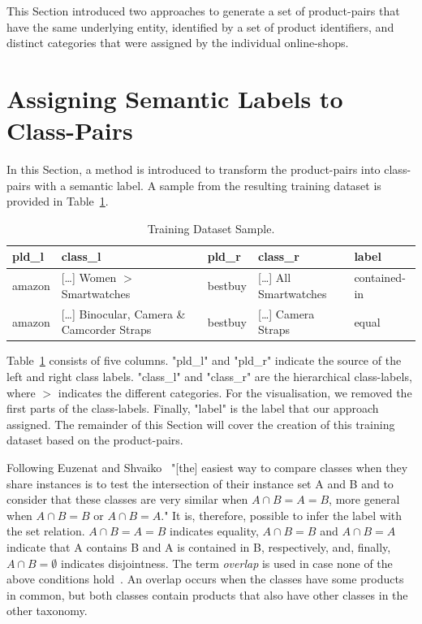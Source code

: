 This Section introduced two approaches to generate a set of product-pairs that have the same underlying
entity, identified by a set of product identifiers, and distinct categories that were assigned by the individual
online-shops.

\section{Assigning Semantic Labels to Class-Pairs}

In this Section, a method is introduced to transform the product-pairs into class-pairs with a semantic label.
A sample from the resulting training dataset is provided in Table~\ref{tab:goldstandard-example}.
\begin{table}[htbp]
    \begin{tabularx}{\textwidth}{lXlX|l}
        pld\_l & class\_l & pld\_r & class\_r & label \\
        \hline
        amazon & [\ldots] Women $>$ Smartwatches & bestbuy & [\ldots] All Smartwatches & contained-in \\
        amazon & [\ldots] Binocular, Camera \& Camcorder Straps & bestbuy & [\ldots] Camera Straps & equal \\
    \end{tabularx}
    \caption{Training Dataset Sample.}
    \label{tab:goldstandard-example}
\end{table}
Table~\ref{tab:goldstandard-example} consists of five columns.
"pld\_l" and "pld\_r" indicate the source of the left and right class labels.
"class\_l" and "class\_r" are the hierarchical class-labels, where $>$ indicates the different categories.
For the visualisation, we removed the first parts of the class-labels.
Finally, "label" is the label that our approach assigned.
The remainder of this Section will cover the creation of this training dataset based on the product-pairs.

Following Euzenat and Shvaiko~\cite[p. 113]{euzenat2007ontology} "[the] easiest way to compare classes when they share instances
is to test the intersection of their instance set A and B and to consider that these classes are very
similar when $A \cap B = A = B$, more general when $A \cap B = B$ or $A \cap B = A$."
It is, therefore, possible to infer the label with the set relation.
$A \cap B = A = B$ indicates equality, $A \cap B = B$ and $A \cap B = A$ indicate that A contains B and
A is contained in B, respectively, and, finally, $A \cap B =  \emptyset$ indicates disjointness.
The term \emph{overlap} is used in case none of the above conditions hold~\cite{larson1989theory}.
An overlap occurs when the classes have some products in common, but both classes contain products that also
have other classes in the other taxonomy.

